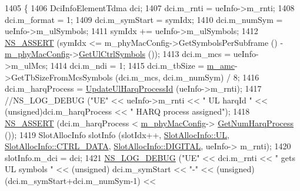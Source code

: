 \begin{DoxyCode}
1405                 \{
1406                         DciInfoElementTdma dci;
1407                         dci.m\_rnti = ueInfo->m\_rnti;
1408                         dci.m\_format = 1;
1409                         dci.m\_symStart = symIdx;
1410                         dci.m\_numSym = ueInfo->m\_ulSymbols;
1411                         symIdx += ueInfo->m\_ulSymbols;
1412                         \hyperlink{assert_8h_a6dccdb0de9b252f60088ce281c49d052}{NS\_ASSERT} (symIdx <= m\_phyMacConfig->GetSymbolsPerSubframe () - 
      \hyperlink{classns3_1_1MmWaveMacScheduler_a24d7af4971d2e500fe543cefbafa2fd9}{m\_phyMacConfig}->\hyperlink{classns3_1_1MmWavePhyMacCommon_aa0bf8af14050bc5dc6513fbc86319a9b}{GetUlCtrlSymbols} ());
1413                         dci.m\_mcs = ueInfo->m\_ulMcs;
1414                         dci.m\_ndi = 1;
1415                         dci.m\_tbSize = \hyperlink{classns3_1_1MmWaveFlexTtiPfMacScheduler_ab9cf29146f4e3094526de08ffe08b193}{m\_amc}->GetTbSizeFromMcsSymbols (dci.m\_mcs, dci.m\_numSym) / 8;
1416                         dci.m\_harqProcess = \hyperlink{classns3_1_1MmWaveFlexTtiPfMacScheduler_a1e0668ff376b99eee763023f6071878c}{UpdateUlHarqProcessId} (ueInfo->m\_rnti);
1417                         \textcolor{comment}{//NS\_LOG\_DEBUG ("UE" << ueInfo->m\_rnti << " UL harqId " <<
       (unsigned)dci.m\_harqProcess << " HARQ process assigned");}
1418                         \hyperlink{assert_8h_a6dccdb0de9b252f60088ce281c49d052}{NS\_ASSERT} (dci.m\_harqProcess < \hyperlink{classns3_1_1MmWaveMacScheduler_a24d7af4971d2e500fe543cefbafa2fd9}{m\_phyMacConfig}->
      \hyperlink{classns3_1_1MmWavePhyMacCommon_a40773d84172ebeb5aff125f56ebcc5ac}{GetNumHarqProcess} ());
1419                         SlotAllocInfo slotInfo (slotIdx++, \hyperlink{structns3_1_1SlotAllocInfo_a6cad60db1d39034f1851e2cea625fe5da916b5be54594ead6ed677c570311cad2}{SlotAllocInfo::UL}, 
      \hyperlink{structns3_1_1SlotAllocInfo_a3ea7cb503bfd0c9a4df55a71b81b9331a1ea636c3f068558fabacbc39934309b8}{SlotAllocInfo::CTRL\_DATA}, \hyperlink{structns3_1_1SlotAllocInfo_adcbd067d82be6260b3399167d8f0b4eca47a67c342db658a08ded9ce4b49417ea}{SlotAllocInfo::DIGITAL}, ueInfo->
      m\_rnti);
1420                         slotInfo.m\_dci = dci;
1421                         \hyperlink{group__logging_ga413f1886406d49f59a6a0a89b77b4d0a}{NS\_LOG\_DEBUG} (\textcolor{stringliteral}{"UE"} << dci.m\_rnti << \textcolor{stringliteral}{" gets UL symbols "} << (\textcolor{keywordtype}{unsigned})
      dci.m\_symStart << \textcolor{stringliteral}{"-"} << (\textcolor{keywordtype}{unsigned})(dci.m\_symStart+dci.m\_numSym-1) <<

\end{DoxyCode}
